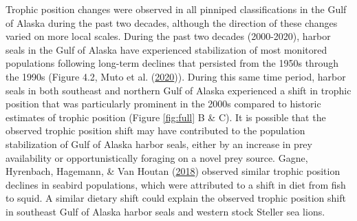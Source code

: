 \documentclass [11pt, proquest] {uwthesis}[2015/03/03]
\begin{document}
Trophic position changes were observed in all pinniped classifications
in the Gulf of Alaska during the past two decades, although the
direction of these changes varied on more local scales. During the past
two decades (2000-2020), harbor seals in the Gulf of Alaska have
experienced stabilization of most monitored populations following
long-term declines that persisted from the 1950s through the 1990s
(Figure 4.2, Muto et al. (\protect\hyperlink{ref-Muto2020}{2020})).
During this same time period, harbor seals in both southeast and
northern Gulf of Alaska experienced a shift in trophic position that was
particularly prominent in the 2000s compared to historic estimates of
trophic position (Figure \ref{fig:full} B \& C). It is possible that the
observed trophic position shift may have contributed to the population
stabilization of Gulf of Alaska harbor seals, either by an increase in
prey availability or opportunistically foraging on a novel prey source.
Gagne, Hyrenbach, Hagemann, \& Van Houtan
(\protect\hyperlink{ref-Gagne2018}{2018}) observed similar trophic
position declines in seabird populations, which were attributed to a
shift in diet from fish to squid. A similar dietary shift could explain
the observed trophic position shift in southeast Gulf of Alaska harbor
seals and western stock Steller sea lions.
\end{document}
